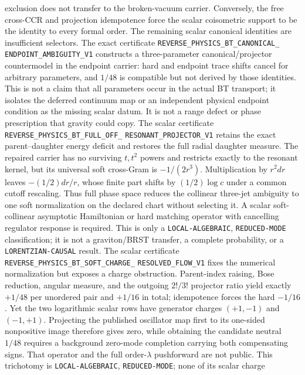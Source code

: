 \documentclass[11pt]{article}
\theoremstyle{definition}
\theoremstyle{remark}
\begin{document}
exclusion does not transfer to the broken-vacuum carrier.  Conversely, the
free cross-CCR and projection idempotence
force the scalar coisometric support to be the identity to every formal order.
The remaining scalar canonical identities are insufficient selectors.  The
exact certificate
\texttt{REVERSE\_PHYSICS\_BT\_CANONICAL\_}
\allowbreak\texttt{ENDPOINT\_AMBIGUITY\_V1}
constructs a three-parameter canonical/projector countermodel in the endpoint
carrier: hard and endpoint trace shifts cancel for arbitrary parameters, and
$1/48$ is compatible but not derived by those identities.  This is not a
claim that all parameters
occur in the actual BT transport; it isolates the deferred continuum map or
an independent physical endpoint condition as the missing scalar datum.  It
is not a range defect or phase prescription that gravity could copy.
The scalar certificate
\texttt{REVERSE\_PHYSICS\_BT\_FULL\_OFF\_}
\allowbreak\texttt{RESONANT\_PROJECTOR\_V1} retains the exact
parent--daughter energy deficit and restores the full radial daughter measure.
The repaired carrier has no surviving $t,t^2$ powers and restricts exactly to
the resonant kernel, but its universal soft cross-Gram is $-1/(2r^3)$.
Multiplication by $r^2dr$ leaves $-(1/2)dr/r$, whose finite part shifts by
$(1/2)\log c$ under a common cutoff rescaling.  Thus full phase space reduces
the collinear three-jet ambiguity to one soft normalization on the declared
chart without selecting it.  A scalar soft-collinear asymptotic Hamiltonian
or hard matching operator with cancelling regulator response is required.
This is only a \texttt{LOCAL-ALGEBRAIC}, \texttt{REDUCED-MODE}
classification; it is not a graviton/BRST transfer, a complete probability,
or a \texttt{LORENTZIAN-CAUSAL} result.
The scalar certificate
\texttt{REVERSE\_PHYSICS\_BT\_SOFT\_CHARGE\_}
\allowbreak\texttt{RESOLVED\_FLOW\_V1} fixes the numerical normalization but
exposes a charge obstruction.  Parent-index raising, Bose reduction,
angular measure, and the outgoing $2!/3!$ projector ratio yield exactly
$+1/48$ per unordered pair and $+1/16$ in total; idempotence forces the hard
$-1/16$.  Yet the two logarithmic scalar rows have generator charges
$(+1,-1)$ and $(-1,+1)$.  Projecting the published oscillator map first to
its one-sided nonpositive image therefore gives zero, while obtaining the
candidate neutral $1/48$ requires a background zero-mode completion carrying
both compensating signs.  That operator and the full order-$\lambda$
pushforward are not public.  This trichotomy is
\texttt{LOCAL-ALGEBRAIC}, \texttt{REDUCED-MODE}; none of its scalar charge
\end{document}
